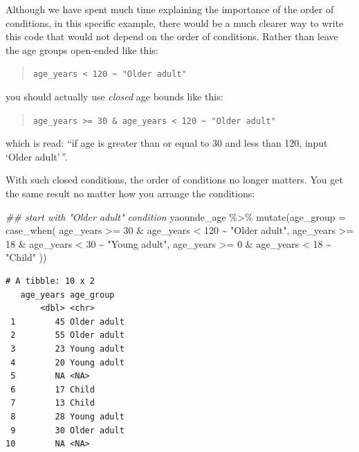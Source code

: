 \documentclass[
  letterpaper,
  DIV=11,
  numbers=noendperiod]{scrreprt}
\newenvironment{Shaded}{\begin{snugshade}}{\end{snugshade}}
\newcommand{\AttributeTok}[1]{\textcolor[rgb]{0.40,0.45,0.13}{#1}}
\newcommand{\DecValTok}[1]{\textcolor[rgb]{0.68,0.00,0.00}{#1}}
\newcommand{\DocumentationTok}[1]{\textcolor[rgb]{0.37,0.37,0.37}{\textit{#1}}}
\newcommand{\FunctionTok}[1]{\textcolor[rgb]{0.28,0.35,0.67}{#1}}
\newcommand{\NormalTok}[1]{\textcolor[rgb]{0.00,0.23,0.31}{#1}}
\newcommand{\SpecialCharTok}[1]{\textcolor[rgb]{0.37,0.37,0.37}{#1}}
\newcommand{\StringTok}[1]{\textcolor[rgb]{0.13,0.47,0.30}{#1}}
\begin{document}
Although we have spent much time explaining the importance of the order
of conditions, in this specific example, there would be a much clearer
way to write this code that would not depend on the order of conditions.
Rather than leave the age groups open-ended like this:

\begin{quote}
\texttt{age\_years\ \textless{}\ 120\ \textasciitilde{}\ "Older\ adult"}
\end{quote}

you should actually use \emph{closed} age bounds like this:

\begin{quote}
\texttt{age\_years\ \textgreater{}=\ 30\ \&\ age\_years\ \textless{}\ 120\ \textasciitilde{}\ "Older\ adult"}
\end{quote}

which is read: ``if age is greater than or equal to 30 and less than
120, input `Older adult'\,''.

With such closed conditions, the order of conditions no longer matters.
You get the same result no matter how you arrange the conditions:

\begin{Shaded}
\begin{Highlighting}[]
\DocumentationTok{\#\# start with "Older adult" condition}
\NormalTok{yaounde\_age }\SpecialCharTok{\%\textgreater{}\%}
  \FunctionTok{mutate}\NormalTok{(}\AttributeTok{age\_group =} \FunctionTok{case\_when}\NormalTok{(}
\NormalTok{    age\_years }\SpecialCharTok{\textgreater{}=} \DecValTok{30} \SpecialCharTok{\&}\NormalTok{ age\_years }\SpecialCharTok{\textless{}} \DecValTok{120} \SpecialCharTok{\textasciitilde{}} \StringTok{"Older adult"}\NormalTok{,}
\NormalTok{    age\_years }\SpecialCharTok{\textgreater{}=} \DecValTok{18} \SpecialCharTok{\&}\NormalTok{ age\_years }\SpecialCharTok{\textless{}} \DecValTok{30} \SpecialCharTok{\textasciitilde{}} \StringTok{"Young adult"}\NormalTok{,}
\NormalTok{    age\_years }\SpecialCharTok{\textgreater{}=} \DecValTok{0} \SpecialCharTok{\&}\NormalTok{ age\_years }\SpecialCharTok{\textless{}} \DecValTok{18} \SpecialCharTok{\textasciitilde{}} \StringTok{"Child"}
\NormalTok{  ))}
\end{Highlighting}
\end{Shaded}

\begin{verbatim}
# A tibble: 10 x 2
   age_years age_group  
       <dbl> <chr>      
 1        45 Older adult
 2        55 Older adult
 3        23 Young adult
 4        20 Young adult
 5        NA <NA>       
 6        17 Child      
 7        13 Child      
 8        28 Young adult
 9        30 Older adult
10        NA <NA>       
\end{verbatim}
\end{document}
